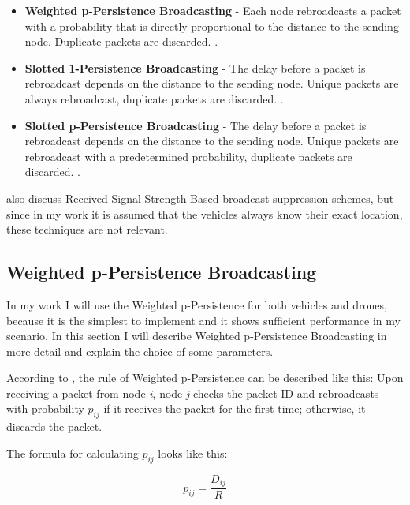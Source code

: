 \documentclass[]{nsm-thesis}
\begin{document}
\begin{itemize}

\item \textbf{Weighted p-Persistence Broadcasting} - Each node rebroadcasts a packet with a probability that is directly proportional to the distance to the sending node. Duplicate packets are discarded. \cite[Page~88]{wisitrophan2007}.

\item \textbf{Slotted 1-Persistence Broadcasting} - The delay before a packet is rebroadcast depends on the distance to the sending node. Unique packets are always rebroadcast, duplicate packets are discarded. \cite[Page~88]{wisitrophan2007}.

\item \textbf{Slotted p-Persistence Broadcasting} - The delay before a packet is rebroadcast depends on the distance to the sending node. Unique packets are rebroadcast with a predetermined probability, duplicate packets are discarded. \cite[Page~89]{wisitrophan2007}.

\end{itemize}

\textcite{wisitrophan2007} also discuss Received-Signal-Strength-Based broadcast suppression schemes, but since in my work it is assumed that the vehicles always know their exact location, these techniques are not relevant.

\subsection{Weighted p-Persistence Broadcasting}

In my work I will use the Weighted p-Persistence for both vehicles and drones, because it is the simplest to implement and it shows sufficient performance in my scenario. In this section I will describe Weighted p-Persistence Broadcasting in more detail and explain the choice of some parameters.

According to \textcite{wisitrophan2007}, the rule of Weighted p-Persistence can be described like this: Upon receiving a packet from node \emph{i}, node \emph{j} checks the packet ID and rebroadcasts with probability $p_{ij}$ if it receives the packet for the first time; otherwise, it discards the packet.

The formula for calculating $p_{ij}$ looks like this:

\begin{equation}\label{eq:bs-p}
p_{ij} = \frac{D_{ij}}{R}
\end{equation}
\end{document}
